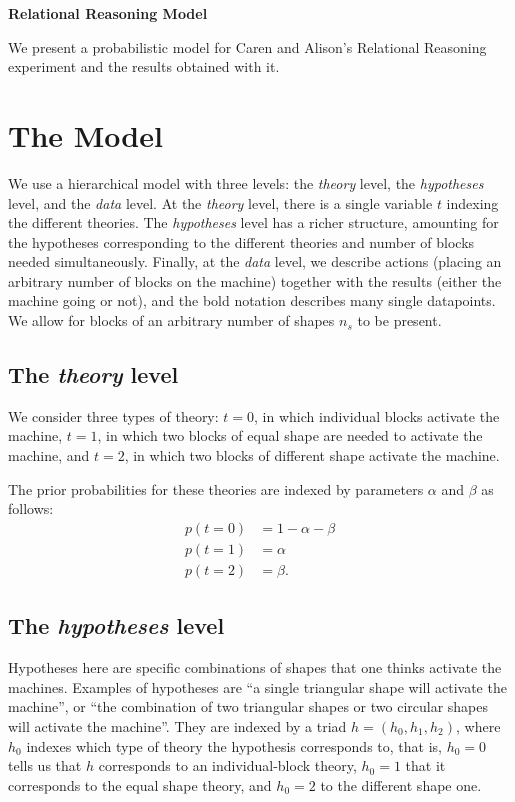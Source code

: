 \documentclass[11pt, a4paper]{article}
\begin{document}
\begin{center}
{\noindent \huge \bf Relational Reasoning Model }\\
\end{center}
 
We present a probabilistic model for Caren and Alison's Relational Reasoning experiment and the results obtained with it.
 
\section*{The Model}
We use a hierarchical model with three levels: the \emph{theory} level, the \emph{hypotheses} level, and the \emph{data} level. At the \emph{theory} level, there is a single variable $t$ indexing the different theories. The \emph{hypotheses} level has a richer structure, amounting for the hypotheses corresponding to the different theories and number of blocks needed simultaneously. Finally, at the \emph{data} level, we describe actions (placing an arbitrary number of blocks on the machine) together with the results (either the machine going or not), and the bold notation describes many single datapoints. We allow for blocks of an arbitrary number of shapes $n_s$ to be present.
 
 
\subsection*{The \emph{theory} level}
We consider three types of theory: $t=0$, in which individual blocks activate the machine, $t=1$, in which two blocks of equal shape are needed to activate the machine, and $t=2$, in which two blocks of different shape activate the machine. 
 
The prior probabilities for these theories are indexed by parameters $\alpha$ and $\beta$ as follows:
\begin{equation}
\begin{split}
p(t=0)&=1-\alpha-\beta\\
p(t=1)&=\alpha\\
p(t=2)&=\beta.
\end{split} 
\end{equation}
 
\subsection*{The \emph{hypotheses} level}
Hypotheses here are specific combinations of shapes that one thinks activate the machines. Examples of hypotheses are ``a single triangular shape will activate the machine'', or ``the combination of two triangular shapes or two circular shapes will activate the machine''. They are indexed by a triad $h=(h_0,h_1,h_2)$, where $h_0$ indexes which type of theory the hypothesis corresponds to, that is, $h_0=0$ tells us that $h$ corresponds to an individual-block theory, $h_0=1$ that it corresponds to the equal shape theory, and $h_0=2$ to the different shape one.
 
\end{document}
